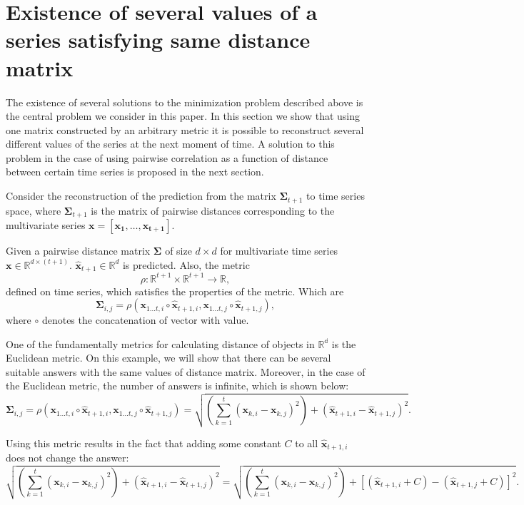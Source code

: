 \documentclass{article}
\begin{document}
\section{Existence of several values of a series satisfying same distance matrix}

The existence of several solutions to the minimization problem described above is the central problem we consider in this paper. In this section we show that using one matrix constructed by an arbitrary metric it is possible to reconstruct several different values of the series at the next moment of time. A solution to this problem in the case of using pairwise correlation as a function of distance between certain time series is proposed in the next section.

Consider the reconstruction of the prediction from the matrix $\mathbf{\Sigma}_{t+1}$ to time series space, where $\mathbf{\Sigma}_{t+1}$ is the matrix of pairwise distances corresponding to the multivariate series $\mathbf{x}=[\mathbf{x_1}, \ldots, \mathbf{x_{t+1}}]$.

Given a pairwise distance matrix $\mathbf{\Sigma}$ of size $d \times d$ for multivariate time series $\mathbf{x} \in \mathbb{R}^{d \times (t+1)}$. $\hat{\mathbf{x}}_{t+1} \in \mathbb{R}^d$ is predicted. Also, the metric \[ \rho : \mathbb{R}^{t+1} \times \mathbb{R}^{t+1} \rightarrow \mathbb{R}, \] defined on time series, which satisfies the properties of the metric. Which are \[\mathbf{\Sigma}_{i,j} = \rho(\mathbf{x}_{1 \ldots t, i} \circ \hat{\mathbf{x}}_{t+1, i}, \mathbf{x}_{1 \ldots t, j} \circ \hat{\mathbf{x}}_{t+1, j}),\] where $\circ$ denotes the concatenation of vector with value.

One of the fundamentally metrics for calculating distance of objects in $\mathbb{R^d}$ is the Euclidean metric. On this example, we will show that there can be several suitable answers with the same values of distance matrix. Moreover, in the case of the Euclidean metric, the number of answers is infinite, which is shown below:
\[\mathbf{\Sigma}_{i,j} = \rho(\mathbf{x}_{1 \ldots t, i} \circ \hat{\mathbf{x}}_{t+1, i}, \mathbf{x}_{1 \ldots t, j} \circ \hat{\mathbf{x}}_{t+1, j})=\sqrt{\left(\sum_{k=1}^t (\mathbf{x}_{k,i}-\mathbf{x}_{k,j})^2\right) + (\hat{\mathbf{x}}_{t+1, i}-\hat{\mathbf{x}}_{t+1, j})^2}.\]

Using this metric results in the fact that adding some constant $C$ to all $\hat{\mathbf{x}}_{t+1, i}$ does not change the answer:
\[
\sqrt{\left(\sum_{k=1}^t (\mathbf{x}_{k,i}-\mathbf{x}_{k,j})^2\right) + (\hat{\mathbf{x}}_{t+1, i}-\hat{\mathbf{x}}_{t+1, j})^2} = \sqrt{\left(\sum_{k=1}^t (\mathbf{x}_{k,i}-\mathbf{x}_{k,j})^2\right) + [(\hat{\mathbf{x}}_{t+1, i} + C) -(\hat{\mathbf{x}}_{t+1, j} + C)]^2}.
\]
\end{document}
